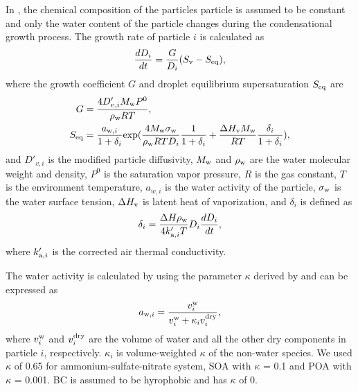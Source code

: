 \documentclass[edeposit,fullpage]{uiucthesis2009}
\begin{document}
In \citet{ching2012impacts}, the chemical composition of the particles
particle is assumed to be constant and only the water content of the
particle changes during the condensational growth process. The growth
rate of particle $i$ is calculated as
\begin{equation}
\centering
\frac{dD_i}{dt} = \frac{G}{D_i}(S_{\rm v}-S_{\rm eq}),
\label{eq:cloud-parcel} 
\end{equation}
where the growth coefficient $G$ and droplet equilibrium supersaturation $S_{\rm eq}$ are
\begin{equation}
\centering
\begin{aligned}
 G & = \frac{4D'_{v,i}M_{\rm w}P^0}{\rho_{\rm w}RT}  ,\\
 S_{\rm eq} & = \frac{a_{{\rm w},i}}{1+\delta_i}{\rm exp}(\frac{4M_{\rm w}\sigma_{\rm w}}{\rho_{\rm w}RTD_i}\frac{1}{1+\delta_i} + \frac{\Delta H_{\rm v}M_{\rm w}}{RT}\frac{\delta_i}{1+\delta_i}),
\end{aligned}
\end{equation}
and $D'_{v,i}$ is the modified particle diffusivity, $M_{\rm w}$ and $\rho_{\rm w }$ are the water molecular weight and density, $P^0$ is the saturation vapor pressure, $R$ is the gas constant, $T$ is the environment temperature, $a_{w,i}$ is the water activity of the particle, $\sigma_{\rm w}$ is the water surface tension, $\Delta H_{\rm v}$ is latent heat of vaporization, and $\delta_i$ is defined as 
\begin{equation}
    \delta_i = \frac{\Delta H_{\rm }\rho_{\rm w}}{4k'_{{\rm a},i}T}D_i\frac{dD_i}{dt},
\end{equation}
where $k'_{{\rm a},i}$ is the corrected air thermal conductivity. 

The water activity is calculated by using the parameter $\kappa$ derived by \citet{Petters2007} and can be expressed as
\begin{equation}
\centering
a_{{\rm w},i} = \frac{v_i^{\rm w}}{v_i^{\rm w} + \kappa_i v_i^{\rm dry}},
\label{eq:activity coeff}    
\end{equation}
where $v_i^{\rm w}$ and $v_i^{\rm dry}$ are the volume of water and
all the other dry components in particle $i$, respectively. $\kappa_i$
is volume-weighted $\kappa$ of the non-water species. We used $\kappa$
of 0.65 for ammonium-sulfate-nitrate system, SOA with $\kappa$ = 0.1
and POA with $\kappa$ = 0.001. BC is assumed to be hyrophobic and has
$\kappa$ of 0.
\end{document}
